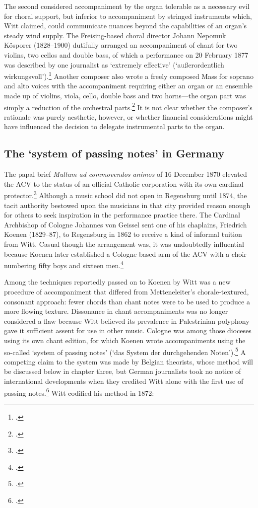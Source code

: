 The second considered accompaniment by the organ tolerable as a necessary evil for choral support, but inferior to accompaniment by stringed instruments which, Witt claimed, could communicate nuances beyond the capabilities of an organ's steady wind supply.
The Freising-based choral director Johann Nepomuk Kösporer (1828--1900) dutifully arranged an accompaniment of chant for two violins, two cellos and double bass, of which a performance on 20 February 1877 was described by one journalist as `extremely effective' (`außerordentlich wirkungsvoll').\footcite[44]{WalterUmschauFreising1877}
Another composer also wrote a freely composed Mass for soprano and alto voices with the accompaniment requiring either an organ or an ensemble made up of violins, viola, cello, double bass and two horns---the organ part was simply a reduction of the orchestral parts.\footcite[1 and \emph{passim}]{HabertMessefurSopran1870}
It is not clear whether the composer's rationale was purely aesthetic, however, or whether financial considerations might have influenced the decision to delegate instrumental parts to the organ.

\subsection{The `system of passing notes' in Germany}
The papal brief \emph{Multum ad commovendos animos} of 16 December 1870 elevated the ACV to the status of an official Catholic corporation with its own cardinal protector.\footcite[128--9]{HayburnPapalLegislationSacred1979}
Although a music school did not open in Regensburg until 1874, the tacit authority bestowed upon the musicians in that city provided reason enough for others to seek inspiration in the performance practice there.
The Cardinal Archbishop of Cologne Johannes von Geissel sent one of his chaplains, Friedrich Koenen (1829--87), to Regensburg in 1862 to receive a kind of informal tuition from Witt.
Casual though the arrangement was, it was undoubtedly influential because Koenen later established a Cologne-based arm of the ACV with a choir numbering fifty boys and sixteen men.\footcite[48--50]{HoevelerKardinalErzbischofPhilippus1899}

Among the techniques reportedly passed on to Koenen by Witt was a new procedure of accompaniment that differed from Metteneleiter's chorale-textured, consonant approach: fewer chords than chant notes were to be used to produce a more flowing texture.
Dissonance in chant accompaniments was no longer considered a flaw because Witt believed its prevalence in Palestrinian polyphony gave it sufficient assent for use in other music.
Cologne was among those dioceses using its own chant edition, for which Koenen wrote accompaniments using the so-called `system of passing notes' (`das System der durchgehenden Noten').\footnote{\covid{}\cite{KoenenKyrialesiveCantus1876}.}
%
A competing claim to the system was made by Belgian theorists, whose method will be discussed below in chapter three, but German journalists took no notice of international developments when they credited Witt alone with the first use of passing notes.\footcite[col.~503]{BaeumkerKirchenmusikMelodiesGregoriennes1880}
%
Witt codified his method in 1872:

